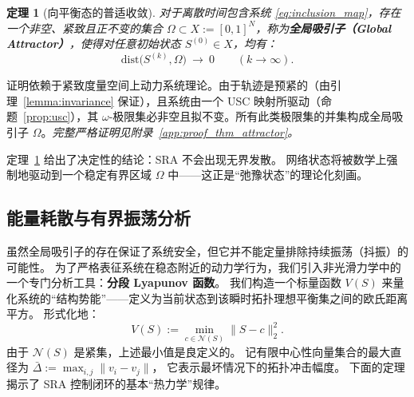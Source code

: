 \documentclass[journal]{IEEEtran}
\theoremstyle{plain}
\newtheorem{theorem}{定理}
\theoremstyle{definition}
\begin{document}
\begin{theorem}[向平衡态的普适收敛]
\label{thm:attractor}
对于离散时间包含系统 \eqref{eq:inclusion_map}，存在一个非空、紧致且正不变的集合 $\Omega\subset X:=[0,1]^N$，称为\textbf{全局吸引子（Global Attractor）}，使得对任意初始状态 $S^{(0)}\in X$，均有：
\begin{equation}\label{eq:attractor_convergence}
\mathrm{dist}\big(S^{(k)},\Omega\big)\ \to\ 0\qquad (k\to\infty).
\end{equation}
\end{theorem}
\begin{IEEEproof}[证明思路]
证明依赖于紧致度量空间上动力系统理论。由于轨迹是预紧的（由引理~\ref{lemma:invariance} 保证），且系统由一个 USC 映射所驱动（命题~\ref{prop:usc}），其 $\omega$-极限集必非空且拟不变。所有此类极限集的并集构成全局吸引子 $\Omega$。\textit{完整严格证明见附录~\ref{app:proof_thm_attractor}。}
\end{IEEEproof}

定理~\ref{thm:attractor} 给出了决定性的结论：SRA 不会出现无界发散。
网络状态将被数学上强制地驱动到一个稳定有界区域 $\Omega$ 中——这正是“弛豫状态”的理论化刻画。

\subsection{能量耗散与有界振荡分析}
\label{subsec:lyapunov}

虽然全局吸引子的存在保证了系统安全，但它并不能定量排除持续振荡（抖振）的可能性。
为了严格表征系统在稳态附近的动力学行为，我们引入非光滑力学中的一个专门分析工具：\textbf{分段 Lyapunov 函数}。
我们构造一个标量函数 $V(S)$ 来量化系统的“结构势能”——定义为当前状态到该瞬时拓扑理想平衡集之间的欧氏距离平方。
形式化地：
\begin{equation}\label{eq:lyapunov_def}
V(S):=\min_{c\in\mathcal N(S)}\|S-c\|_2^2.
\end{equation}
由于 $\mathcal N(S)$ 是紧集，上述最小值是良定义的。
记有限中心性向量集合的最大直径为
$\bar{\Delta} := \max_{i,j} \|v_i - v_j\|$，
它表示最坏情况下的拓扑冲击幅度。
下面的定理揭示了 SRA 控制闭环的基本“热力学”规律。
\end{document}
